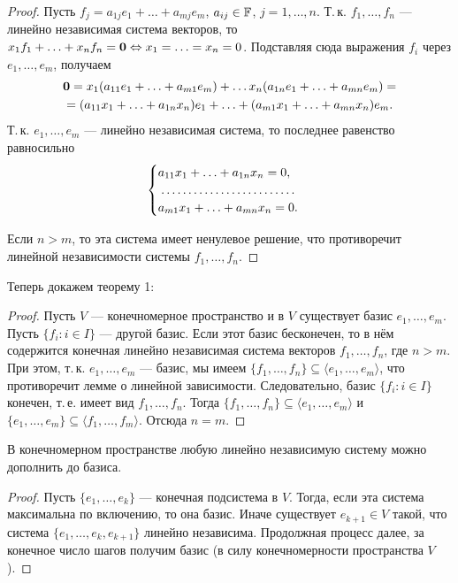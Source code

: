 \begin{proof}
    Пусть $f_j = a_{1j}e_1 + \ldots + a_{mj}e_m$, $a_{ij} \in \mathbb{F}$, $j = 1, \ldots, n$. Т.\,к. $f_1, \ldots, f_n$ --- линейно независимая система векторов, то $x_1f_1 + \ldots + x_nf_n = \boldsymbol{0} \Leftrightarrow x_1 = \ldots = x_n = 0$. Подставляя сюда выражения $f_i$ через $e_1, \ldots, e_m$, получаем
    \begin{multline*}
        \boldsymbol{0} = x_1(a_{11}e_1 + \ldots + a_{m1}e_m) + \ldots x_n(a_{1n}e_1 + \ldots + a_{mn}e_m) =\\ = (a_{11}x_1 + \ldots + a_{1n}x_n)e_1 + \ldots + (a_{m1}x_1 + \ldots + a_{mn}x_n)e_m.
    \end{multline*}
    Т.\,к. $e_1, \ldots, e_m$ --- линейно независимая система, то последнее равенство равносильно
    \[
        \begin{cases}
            a_{11}x_1 + \ldots + a_{1n}x_n = 0,\\
            \dotfill\\
            a_{m1}x_1 + \ldots + a_{mn}x_n = 0.
        \end{cases}
    \]

    Если $n > m$, то эта система имеет ненулевое решение, что противоречит линейной независимости системы $f_1, \ldots, f_n$.
\end{proof}

Теперь докажем теорему 1:

\begin{proof}
    Пусть $V$ --- конечномерное пространство и в $V$ существует базис $e_1, \ldots, e_m$. Пусть $\{f_i : i \in I\}$ --- другой базис. Если этот базис бесконечен, то в нём содержится конечная линейно независимая система векторов $f_1, \ldots, f_n$, где $n > m$. При этом, т.\,к. $e_1, \ldots, e_m$ --- базис, мы имеем $\{f_1, \ldots, f_n\} \subseteq \langle e_1, \ldots, e_m\rangle$, что противоречит лемме о линейной зависимости. Следовательно, базис $\{f_i : i \in I\}$ конечен, т.\,е. имеет вид $f_1, \ldots, f_n$. Тогда $\{f_1, \ldots, f_n\} \subseteq \langle e_1, \ldots, e_m \rangle$ и $\{e_1, \ldots, e_m\} \subseteq \langle f_1, \ldots, f_m\rangle$. Отсюда $n = m$.
\end{proof}

\begin{lemma}
    В конечномерном пространстве любую линейно независимую систему можно дополнить до базиса.
\end{lemma}

\begin{proof}
    Пусть $\{e_1, \ldots, e_k\}$ --- конечная подсистема в $V$. Тогда, если эта система максимальна по включению, то она базис. Иначе существует $e_{k + 1} \in V$ такой, что система $\{e_1, \ldots, e_k, e_{k + 1}\}$ линейно независима. Продолжная процесс далее, за конечное число шагов получим базис (в силу конечномерности пространства $V$).
\end{proof}

